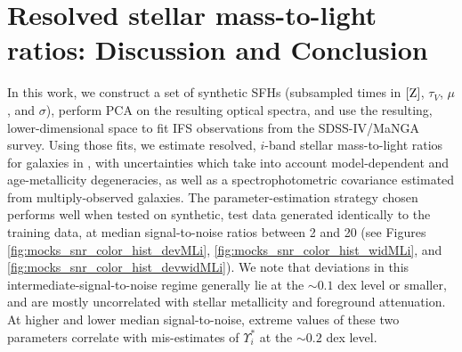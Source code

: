 \section{Resolved stellar mass-to-light ratios: Discussion and Conclusion}
\label{chap1:sec:discussion}

In this work, we construct a set of \nSFHs synthetic SFHs (subsampled \nsubsample times in ${\rm [Z]}$, $\tau_V$, $\mu$, and $\sigma$), perform PCA on the resulting optical spectra, and use the resulting, lower-dimensional space to fit IFS observations from the SDSS-IV/MaNGA survey. Using those fits, we estimate resolved, $i$-band stellar mass-to-light ratios for galaxies in \mplv, with uncertainties which take into account model-dependent and age-metallicity degeneracies, as well as a spectrophotometric covariance estimated from multiply-observed galaxies. The parameter-estimation strategy chosen performs well when tested on synthetic, test data generated identically to the training data, at median signal-to-noise ratios between 2 and 20 (see Figures \ref{fig:mocks_snr_color_hist_devMLi}, \ref{fig:mocks_snr_color_hist_widMLi}, and \ref{fig:mocks_snr_color_hist_devwidMLi}). We note that deviations in this intermediate-signal-to-noise regime generally lie at the $\sim 0.1$ dex level or smaller, and are mostly uncorrelated with stellar metallicity and foreground attenuation. At higher and lower median signal-to-noise, extreme values of these two parameters correlate with mis-estimates of $\Upsilon^*_i$ at the $\sim 0.2$ dex level.

